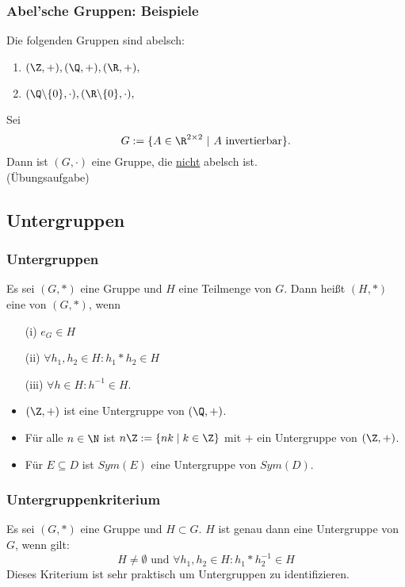 \begin{frame}\frametitle{Abel'sche Gruppen: Beispiele}
	
	Die folgenden Gruppen sind abelsch:
	\begin{enumerate}
		\item $(\Z,+), (\Q,+), (\R,+),$\pause
		\item $(\Q\backslash\{0\}, \cdot), (\R\backslash\{0\}, \cdot),$
	\end{enumerate}
	\vfill \pause
	Sei
	$$
		G:= \{ A \in \R^{2\times 2}~|~ A \text{ invertierbar} \}.
	$$
	Dann ist $(G,\cdot)$ eine Gruppe, die \underline{nicht} abelsch ist.\\[1mm]
	(\"Ubungsaufgabe)
	
	
\end{frame}
%
\subsection{Untergruppen}
%
\begin{frame}\frametitle{Untergruppen}
Es sei $(G,\ast)$ eine Gruppe und $H$ eine Teilmenge von $G$. Dann heißt $(H, \ast)$ eine  von $(G,\ast)$, wenn
\begin{itemize}
\item[(i)] $e_G \in H$
\item[(ii)] $\forall h_1,h_2 \in H: h_1\ast h_2 \in H$
\item[(iii)] $\forall h \in H: h^{-1} \in H$.
\end{itemize}
\pause
\vfill
{}
\begin{itemize}
\item $(\Z,+)$ ist eine Untergruppe von $(\Q,+)$. \pause
\item Für alle $n \in \N$ ist $n\Z:=\{nk \mid k \in \Z\}$ mit $+$ ein Untergruppe von $(\Z,+)$. \pause
\item Für $E \subseteq D$ ist $Sym(E)$ eine Untergruppe von $Sym(D)$.
\end{itemize}
\end{frame}
%
\begin{frame}\frametitle{Untergruppenkriterium}
Es sei $(G,\ast)$ eine Gruppe und $H \subset G$. $H$ ist genau dann eine Untergruppe von $G$, wenn gilt:
$$
H\ne \emptyset \text{  und  } \forall h_1,h_2 \in H: h_1 \ast h_2^{-1} \in H
$$
\vfill \pause
Dieses Kriterium ist sehr praktisch um Untergruppen zu identifizieren.
\end{frame}
